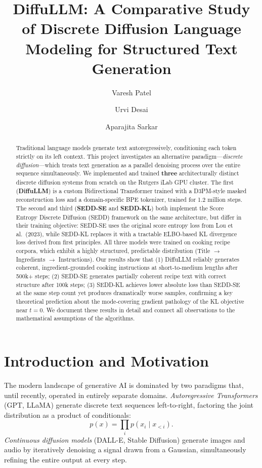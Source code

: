 \documentclass[11pt,a4paper]{article}
\title{\textbf{DiffuLLM: A Comparative Study of Discrete Diffusion Language Modeling for Structured Text Generation}}
\author{Varesh Patel \and Urvi Desai \and Aparajita Sarkar}
\date{}
\begin{document}
\maketitle

\begin{abstract}
Traditional language models generate text autoregressively, conditioning each token strictly on its left context. This project investigates an alternative paradigm---\emph{discrete diffusion}---which treats text generation as a parallel denoising process over the entire sequence simultaneously. We implemented and trained \textbf{three} architecturally distinct discrete diffusion systems from scratch on the Rutgers iLab GPU cluster. The first (\textbf{DiffuLLM}) is a custom Bidirectional Transformer trained with a D3PM-style masked reconstruction loss and a domain-specific BPE tokenizer, trained for 1.2 million steps. The second and third (\textbf{SEDD-SE} and \textbf{SEDD-KL}) both implement the Score Entropy Discrete Diffusion (SEDD) framework on the same architecture, but differ in their training objective: SEDD-SE uses the original score entropy loss from Lou et al.\ (2023), while SEDD-KL replaces it with a tractable ELBO-based KL divergence loss derived from first principles. All three models were trained on cooking recipe corpora, which exhibit a highly structured, predictable distribution (Title $\to$ Ingredients $\to$ Instructions). Our results show that (1) DiffuLLM reliably generates coherent, ingredient-grounded cooking instructions at short-to-medium lengths after 500k+ steps; (2) SEDD-SE generates partially coherent recipe text with correct structure after 100k steps; (3) SEDD-KL achieves lower absolute loss than SEDD-SE at the same step count yet produces dramatically worse samples, confirming a key theoretical prediction about the mode-covering gradient pathology of the KL objective near $t = 0$. We document these results in detail and connect all observations to the mathematical assumptions of the algorithms.
\end{abstract}

\tableofcontents
\newpage

\section{Introduction and Motivation}

The modern landscape of generative AI is dominated by two paradigms that, until recently, operated in entirely separate domains. \emph{Autoregressive Transformers} (GPT, LLaMA) generate discrete text sequences left-to-right, factoring the joint distribution as a product of conditionals:
\[
  p(x) = \prod_i p(x_i \mid x_{<i}).
\]
\emph{Continuous diffusion models} (DALL-E, Stable Diffusion) generate images and audio by iteratively denoising a signal drawn from a Gaussian, simultaneously refining the entire output at every step.
\end{document}
